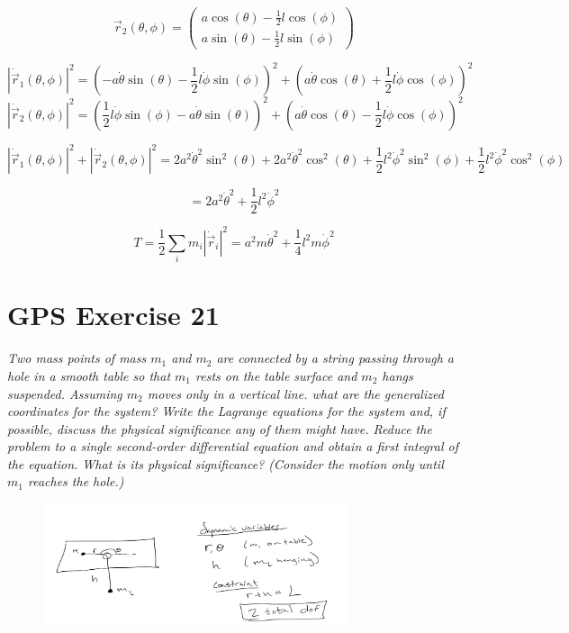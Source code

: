 \documentclass[12pt, letterpaper]{article}
\begin{document}
$$
\vec{r}_{2}\left(\theta, \phi\right) = \left(\begin{array}{l}
a \cos (\theta)-\frac{1}{2} l \cos (\phi) \\
a \sin (\theta)-\frac{1}{2} l \sin (\phi)
\end{array}\right)
$$


$$
\left| \dot{\vec{r}}_{1}\left(\theta, \phi\right) \right|^2= 
\left(-a \dot{\theta} \sin (\theta)-\frac{1}{2} l \dot{\phi} \sin (\phi)\right)^{2}+\left(a \dot{\theta} \cos (\theta)+\frac{1}{2} l \dot{\phi} \cos (\phi)\right)^{2}
$$
$$
\left| \dot{\vec{r}}_{2}\left(\theta, \phi\right) \right|^2= 
\left(\frac{1}{2} l \dot{\phi} \sin (\phi)-a \dot{\theta} \sin (\theta)\right)^{2}+\left(a \dot{\theta} \cos (\theta)-\frac{1}{2} l \dot{\phi} \cos (\phi)\right)^{2}
$$

$$\left| \dot{\vec{r}}_{1}\left(\theta, \phi\right) \right|^2+\left| \dot{\vec{r}}_{2}\left(\theta, \phi\right) \right|^2 = 
2 a^{2} \dot{\theta}^{2} \sin ^{2}(\theta)+2 a^{2} \dot{\theta}^{2} \cos ^{2}(\theta)+\frac{1}{2} l^{2} \dot{\phi}^{2} \sin ^{2}(\phi)+\frac{1}{2} l^{2} \dot{\phi}^{2} \cos ^{2}(\phi)
$$

$$
=2 a^{2} \dot{\theta}^{2}+\frac{1}{2} l^{2} \dot{\phi}^{2}
$$


$$
\boxed{
T=\frac{1}{2} \sum_{i} m_{i}\left|\dot{\vec{r}}_{i}\right|^{2} = a^{2} m \dot{\theta}^{2}+\frac{1}{4} l^{2} m \dot{\phi}^{2}
}
$$

\section{GPS Exercise 21}
\textit{Two mass points of mass $m_{1}$ and $m_{2}$ are connected by a string passing through a hole in a smooth table so that $m_{1}$ rests on the table surface and $m_{2}$ hangs suspended. Assuming $m_{2}$ moves only in a vertical line. what are the generalized coordinates for the system? Write the Lagrange equations for the system and, if possible, discuss the physical significance any of them might have. Reduce the problem to a single second-order differential equation and obtain a first integral of the equation. What is its physical significance? (Consider the motion only until $m_{1}$ reaches the hole.)}


\begin{figure}[h!]
    \centering
    \includegraphics[width=0.8\textwidth]{figures/p21_fig1.png}
\end{figure}
\end{document}
